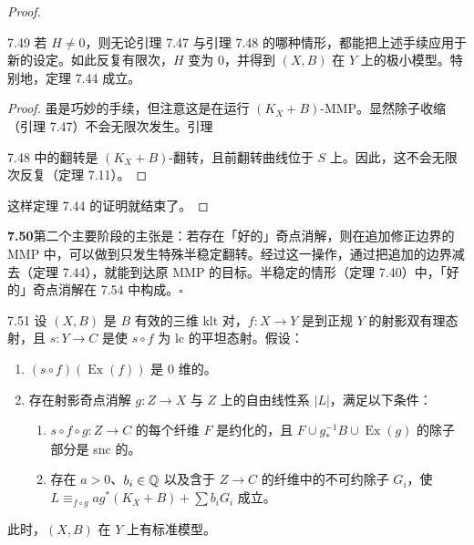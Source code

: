 \begin{proof}
\begin{lemmap}{7.49}
若 $H\ne0$，则无论引理 7.47 与引理 7.48 的哪种情形，都能把上述手续应用于新的设定。如此反复有限次，$H$ 变为 0，并得到 $(X,B)$ 在 $Y$ 上的极小模型。特别地，定理 7.44 成立。
\end{lemmap}

\begin{proof}
虽是巧妙的手续，但注意这是在运行 $(K_X+B)$-MMP。显然除子收缩（引理 7.47）不会无限次发生。引理

7.48 中的翻转是 $(K_X+B)$-翻转，且前翻转曲线位于 $S$ 上。因此，这不会无限次反复（定理 7.11）。
\end{proof}

这样定理 7.44 的证明就结束了。
\end{proof}

\par\medskip\noindent\textbf{7.50}\quad 第二个主要阶段的主张是：若存在「好的」奇点消解，则在追加修正边界的 MMP 中，可以做到只发生特殊半稳定翻转。经过这一操作，通过把追加的边界减去（定理 7.44），就能到达原 MMP 的目标。半稳定的情形（定理 7.40）中，「好的」奇点消解在 7.54 中构成。\hfill$\square$


\begin{theorem*}{7.51}
设 $(X,B)$ 是 $B$ 有效的三维 klt 对，$f\colon X\to Y$ 是到正规 $Y$ 的射影双有理态射，且 $s\colon Y\to C$ 是使 $s\circ f$ 为 lc 的平坦态射。假设：
\begin{enumerate}[label=(\arabic*),leftmargin=2.4em,itemsep=1pt,topsep=2pt,parsep=0pt]
\item $(s\circ f)(\operatorname{Ex}(f))$ 是 0 维的。
\item 存在射影奇点消解 $g\colon Z\to X$ 与 $Z$ 上的自由线性系 $|L|$，满足以下条件：
\begin{enumerate}[label=(\alph*),leftmargin=2.6em,itemsep=1pt,topsep=2pt,parsep=0pt]
\item $s\circ f\circ g\colon Z\to C$ 的每个纤维 $F$ 是约化的，且 $F\cup g_*^{-1}B\cup\operatorname{Ex}(g)$ 的除子部分是 snc 的。
\item 存在 $a>0$、$b_i\in\mathbb{Q}$ 以及含于 $Z\to C$ 的纤维中的不可约除子 $G_i$，使 $L\equiv_{f\circ g}ag^*(K_X+B)+\sum b_iG_i$ 成立。
\end{enumerate}
\end{enumerate}
此时，$(X,B)$ 在 $Y$ 上有标准模型。
\end{theorem*}

